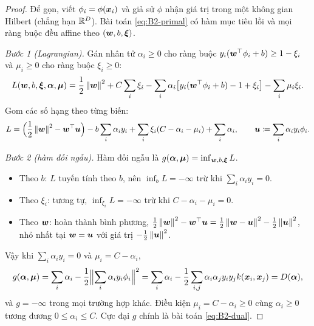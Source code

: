 \begin{proof}
Để gọn, viết $\phi_i = \phi(\bm{x}_i)$ và giả sử $\phi$ nhận giá trị trong một không gian Hilbert
(chẳng hạn $\mathbb{R}^D$). Bài toán \eqref{eq:B2-primal} có hàm mục tiêu lồi và mọi ràng buộc đều
affine theo $(\bm{w}, b, \bm{\xi})$.

\emph{Bước 1 (Lagrangian).} Gán nhân tử $\alpha_i \ge 0$ cho ràng buộc
$y_i(\bm{w}^{\top}\phi_i + b) \ge 1 - \xi_i$ và $\mu_i \ge 0$ cho ràng buộc $\xi_i \ge 0$:
\[
  L(\bm{w}, b, \bm{\xi}, \bm{\alpha}, \bm{\mu}) = \frac12\left\lVert \bm{w} \right\rVert^2 + C\sum_i \xi_i
  - \sum_i \alpha_i\bigl[y_i(\bm{w}^{\top}\phi_i + b) - 1 + \xi_i\bigr] - \sum_i \mu_i\xi_i .
\]
Gom các số hạng theo từng biến:
\[
  L = \Bigl(\frac12\left\lVert \bm{w} \right\rVert^2 - \bm{w}^{\top}\bm{u}\Bigr) - b\sum_i \alpha_i y_i
  + \sum_i \xi_i (C - \alpha_i - \mu_i) + \sum_i \alpha_i,
  \qquad \bm{u} \coloneqq \sum_i \alpha_i y_i \phi_i .
\]

\emph{Bước 2 (hàm đối ngẫu).} Hàm đối ngẫu là $g(\bm{\alpha}, \bm{\mu}) = \inf_{\bm{w}, b, \bm{\xi}} L$.
\begin{itemize}
  \item Theo $b$: $L$ tuyến tính theo $b$, nên $\inf_b L = -\infty$ trừ khi $\sum_i \alpha_i y_i = 0$.
  \item Theo $\xi_i$: tương tự, $\inf_{\xi_i} L = -\infty$ trừ khi $C - \alpha_i - \mu_i = 0$.
  \item Theo $\bm{w}$: hoàn thành bình phương,
  $\frac12\left\lVert \bm{w} \right\rVert^2 - \bm{w}^{\top}\bm{u} = \frac12\left\lVert \bm{w} - \bm{u} \right\rVert^2 - \frac12\left\lVert \bm{u} \right\rVert^2$,
  nhỏ nhất tại $\bm{w} = \bm{u}$ với giá trị $-\frac12\left\lVert \bm{u} \right\rVert^2$.
\end{itemize}
Vậy khi $\sum_i \alpha_i y_i = 0$ và $\mu_i = C - \alpha_i$,
\[
  g(\bm{\alpha}, \bm{\mu}) = \sum_i \alpha_i - \frac12\Bigl\lVert \sum_i \alpha_i y_i \phi_i \Bigr\rVert^2
  = \sum_i \alpha_i - \frac12\sum_{i,j} \alpha_i \alpha_j y_i y_j k(\bm{x}_i, \bm{x}_j) = D(\bm{\alpha}),
\]
và $g = -\infty$ trong mọi trường hợp khác. Điều kiện $\mu_i = C - \alpha_i \ge 0$ cùng
$\alpha_i \ge 0$ tương đương $0 \le \alpha_i \le C$. Cực đại $g$ chính là bài toán \eqref{eq:B2-dual}.


\end{proof}
